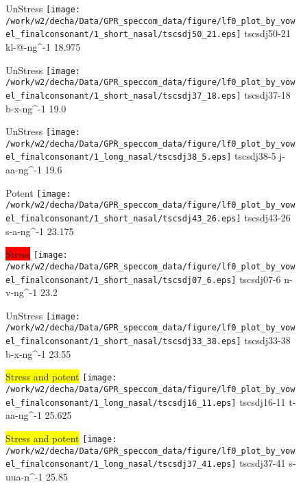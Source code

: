 \documentclass{article}
\begin{document}
\begin{figure}[t]
\begin{minipage}[b]{.24\textwidth}
UnStress
\centering
\texttt{[image: /work/w2/decha/Data/GPR\_speccom\_data/figure/lf0\_plot\_by\_vowel\_finalconsonant/1\_short\_nasal/tscsdj50\_21.eps]}
tscsdj50-21 kl-@-ng\textasciicircum-1 18.975
\end{minipage}
\begin{minipage}[b]{.24\textwidth}
UnStress
\centering
\texttt{[image: /work/w2/decha/Data/GPR\_speccom\_data/figure/lf0\_plot\_by\_vowel\_finalconsonant/1\_short\_nasal/tscsdj37\_18.eps]}
tscsdj37-18 b-x-ng\textasciicircum-1 19.0
\end{minipage}
\begin{minipage}[b]{.24\textwidth}
UnStress
\centering
\texttt{[image: /work/w2/decha/Data/GPR\_speccom\_data/figure/lf0\_plot\_by\_vowel\_finalconsonant/1\_long\_nasal/tscsdj38\_5.eps]}
tscsdj38-5 j-aa-ng\textasciicircum-1 19.6
\end{minipage}
\begin{minipage}[b]{.24\textwidth}
\colorbox{Apricot}{Potent}
\centering
\texttt{[image: /work/w2/decha/Data/GPR\_speccom\_data/figure/lf0\_plot\_by\_vowel\_finalconsonant/1\_short\_nasal/tscsdj43\_26.eps]}
tscsdj43-26 s-a-ng\textasciicircum-1 23.175
\end{minipage}
\end{figure}
\clearpage
\begin{figure}[t]
\begin{minipage}[b]{.24\textwidth}
\colorbox{red}{Stress}
\centering
\texttt{[image: /work/w2/decha/Data/GPR\_speccom\_data/figure/lf0\_plot\_by\_vowel\_finalconsonant/1\_short\_nasal/tscsdj07\_6.eps]}
tscsdj07-6 n-v-ng\textasciicircum-1 23.2
\end{minipage}
\begin{minipage}[b]{.24\textwidth}
UnStress
\centering
\texttt{[image: /work/w2/decha/Data/GPR\_speccom\_data/figure/lf0\_plot\_by\_vowel\_finalconsonant/1\_short\_nasal/tscsdj33\_38.eps]}
tscsdj33-38 b-x-ng\textasciicircum-1 23.55
\end{minipage}
\begin{minipage}[b]{.24\textwidth}
\colorbox{yellow}{Stress and potent}
\centering
\texttt{[image: /work/w2/decha/Data/GPR\_speccom\_data/figure/lf0\_plot\_by\_vowel\_finalconsonant/1\_long\_nasal/tscsdj16\_11.eps]}
tscsdj16-11 t-aa-ng\textasciicircum-1 25.625
\end{minipage}
\begin{minipage}[b]{.24\textwidth}
\colorbox{yellow}{Stress and potent}
\centering
\texttt{[image: /work/w2/decha/Data/GPR\_speccom\_data/figure/lf0\_plot\_by\_vowel\_finalconsonant/1\_long\_nasal/tscsdj37\_41.eps]}
tscsdj37-41 s-uua-n\textasciicircum-1 25.85
\end{minipage}
\end{figure}
\end{document}

